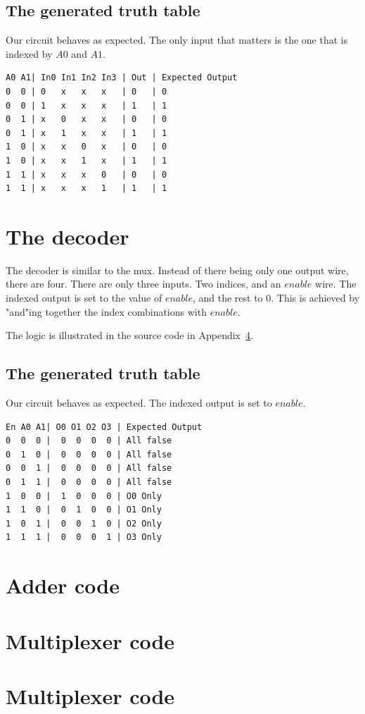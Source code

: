 \documentclass[]{article}
\begin{document}
\subsection{The generated truth table}

Our circuit behaves as expected. The only input that matters is the one that is indexed by $A0$ and $A1$.

\begin{lstlisting}
A0 A1| In0 In1 In2 In3 | Out | Expected Output
0  0 | 0   x   x   x   | 0   | 0
0  0 | 1   x   x   x   | 1   | 1
0  1 | x   0   x   x   | 0   | 0
0  1 | x   1   x   x   | 1   | 1
1  0 | x   x   0   x   | 0   | 0
1  0 | x   x   1   x   | 1   | 1
1  1 | x   x   x   0   | 0   | 0
1  1 | x   x   x   1   | 1   | 1
\end{lstlisting}

\section{The decoder}

The decoder is similar to the mux. Instead of there being only one output wire, there are four. There are only three inputs. Two indices, and an $enable$ wire. The indexed output is set to the value of $enable$, and the rest to $0$. This is achieved by "and"ing together the index combinations with $enable$.

The logic is illustrated in the source code in Appendix~\ref{decoder}.

\subsection{The generated truth table}

Our circuit behaves as expected. The indexed output is set to $enable$.

\begin{lstlisting}
En A0 A1| O0 O1 O2 O3 | Expected Output
0  0  0 |  0  0  0  0 | All false
0  1  0 |  0  0  0  0 | All false
0  0  1 |  0  0  0  0 | All false
0  1  1 |  0  0  0  0 | All false
1  0  0 |  1  0  0  0 | O0 Only
1  1  0 |  0  1  0  0 | O1 Only
1  0  1 |  0  0  1  0 | O2 Only
1  1  1 |  0  0  0  1 | O3 Only
\end{lstlisting}

\appendix

\section{Adder code}



\section{Multiplexer code} \label{plexer}



\section{Multiplexer code} \label{decoder}


\end{document}
